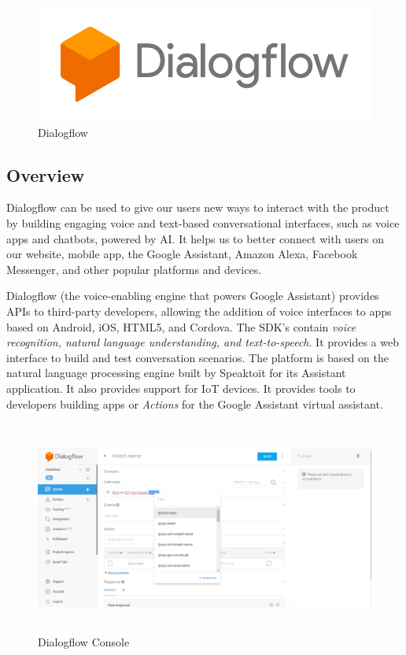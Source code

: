 \begin{figure}[h]
\label{ss}    %
\centering
\includegraphics[width= 6 cm]{dialogflow.jpg}
\caption{Dialogflow}
\end{figure}

\subsection{Overview}

Dialogflow can be used to give our users new ways to interact with the product by building engaging voice and text-based conversational interfaces, such as voice apps and chatbots, powered by AI. It helps us to better connect with users on our website, mobile app, the Google Assistant, Amazon Alexa, Facebook Messenger, and other popular platforms and devices.

Dialogflow (the voice-enabling engine that powers Google Assistant) provides APIs to third-party developers, allowing the addition of voice interfaces to apps based on Android, iOS, HTML5, and Cordova. The SDK's contain {\em voice recognition, natural language understanding, and text-to-speech}. It provides a web interface to build and test conversation scenarios. The platform is based on the natural language processing engine built by Speaktoit for its Assistant application. It also provides support for IoT devices. It provides tools to developers building apps or {\em Actions} for the Google Assistant virtual assistant.\\

\begin{figure}[h]
\label{ss}    %
\centering
\includegraphics[width= 13 cm, height = 7cm]{dialogflowdash.png}
\caption{Dialogflow Console}
\end{figure}

